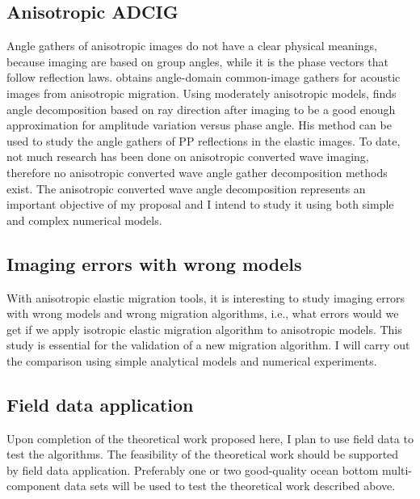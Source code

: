 \subsection{Anisotropic ADCIG}
Angle gathers of anisotropic images do not have a clear physical meanings, because imaging are based on group angles, while it is the phase vectors that follow reflection laws. \cite{biondi:S81} obtains angle-domain common-image gathers for acoustic images from anisotropic migration. Using moderately anisotropic models, \cite{biondi:S81} finds angle decomposition based on ray direction after imaging to be a good enough approximation for amplitude variation versus phase angle. 
His method can be used to study the angle gathers of PP reflections in the elastic images. 
To date, not much research has been done on anisotropic converted wave imaging, therefore no anisotropic converted wave angle gather decomposition methods exist. 
The anisotropic converted wave angle decomposition represents an important objective of my proposal and I intend to study it using both simple and complex numerical models.


\subsection{Imaging errors with wrong models}
With anisotropic elastic migration tools, it is interesting to study imaging errors with wrong models and wrong migration algorithms, i.e., what errors would we get if we apply isotropic elastic migration algorithm to anisotropic models. This study is essential for the validation of a new migration algorithm. I will carry out the comparison using simple analytical models and numerical experiments.

\subsection{Field data application}
Upon completion of the theoretical work proposed here, I plan to use field data to test the algorithms. The feasibility of the theoretical work should be supported by field data application. 
Preferably one or two good-quality ocean bottom multi-component data sets will be used to test the theoretical work described above.


